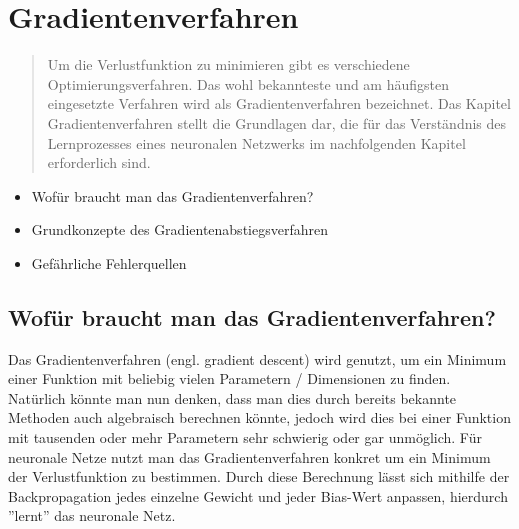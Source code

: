 \newpage
\thispagestyle{empty}
\section{Gradientenverfahren}\label{sec:gradientenverfahren}   
\begin{tcolorbox}[title={Inhalte des \textit{Gradientenverfahren}}]
  \begin{quotation}\noindent
    Um die Verlustfunktion zu minimieren gibt es verschiedene Optimierungsverfahren. Das wohl bekannteste und am häufigsten eingesetzte Verfahren wird als Gradientenverfahren bezeichnet.
    Das Kapitel Gradientenverfahren stellt die Grundlagen dar, die für das Verständnis des Lernprozesses eines neuronalen Netzwerks im nachfolgenden Kapitel erforderlich sind.
  \end{quotation}
  \begin{itemize}
    \item Wofür braucht man das Gradientenverfahren?
    \item Grundkonzepte des Gradientenabstiegsverfahren
    \item Gefährliche Fehlerquellen

  \end{itemize}
\end{tcolorbox}


\subsection{Wofür braucht man das Gradientenverfahren?}\label{subsec:gradientenverfahren:wofuer}
Das Gradientenverfahren (engl. gradient descent) wird genutzt, um ein Minimum einer Funktion mit beliebig vielen Parametern / Dimensionen zu finden.
Natürlich könnte man nun denken, dass man dies durch bereits bekannte Methoden auch algebraisch berechnen könnte, jedoch wird dies 
bei einer Funktion mit tausenden oder mehr Parametern sehr schwierig oder gar unmöglich.
Für neuronale Netze nutzt man das Gradientenverfahren konkret um ein Minimum der Verlustfunktion zu bestimmen. 
Durch diese Berechnung lässt sich mithilfe der Backpropagation jedes einzelne Gewicht und jeder Bias-Wert anpassen, hierdurch ''lernt'' das neuronale Netz.

